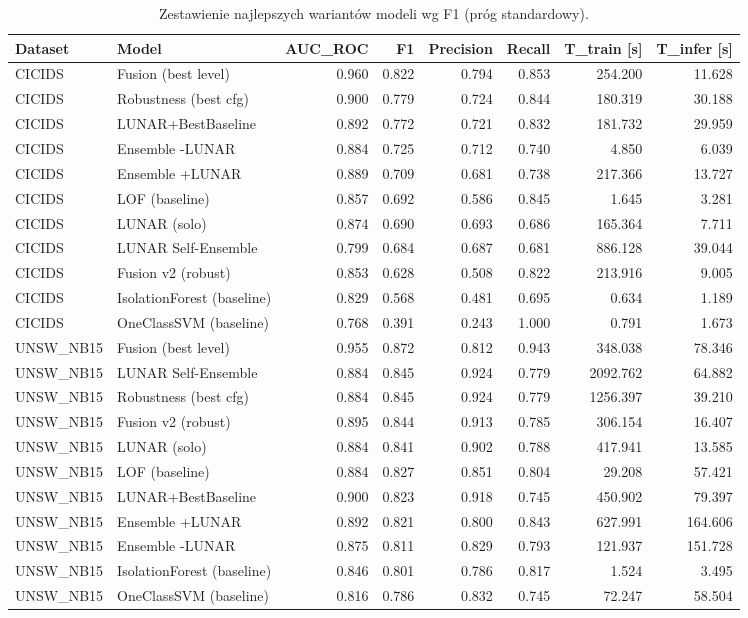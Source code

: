 \begin{table}
\caption{Zestawienie najlepszych wariantów modeli wg F1 (próg standardowy).}
\label{tab:final_comparison}
\begin{tabular}{llrrrrrr}
\toprule
Dataset & Model & AUC\_ROC & F1 & Precision & Recall & T\_train [s] & T\_infer [s] \\
\midrule
CICIDS & Fusion (best level) & 0.960 & 0.822 & 0.794 & 0.853 & 254.200 & 11.628 \\
CICIDS & Robustness (best cfg) & 0.900 & 0.779 & 0.724 & 0.844 & 180.319 & 30.188 \\
CICIDS & LUNAR+BestBaseline & 0.892 & 0.772 & 0.721 & 0.832 & 181.732 & 29.959 \\
CICIDS & Ensemble -LUNAR & 0.884 & 0.725 & 0.712 & 0.740 & 4.850 & 6.039 \\
CICIDS & Ensemble +LUNAR & 0.889 & 0.709 & 0.681 & 0.738 & 217.366 & 13.727 \\
CICIDS & LOF (baseline) & 0.857 & 0.692 & 0.586 & 0.845 & 1.645 & 3.281 \\
CICIDS & LUNAR (solo) & 0.874 & 0.690 & 0.693 & 0.686 & 165.364 & 7.711 \\
CICIDS & LUNAR Self-Ensemble & 0.799 & 0.684 & 0.687 & 0.681 & 886.128 & 39.044 \\
CICIDS & Fusion v2 (robust) & 0.853 & 0.628 & 0.508 & 0.822 & 213.916 & 9.005 \\
CICIDS & IsolationForest (baseline) & 0.829 & 0.568 & 0.481 & 0.695 & 0.634 & 1.189 \\
CICIDS & OneClassSVM (baseline) & 0.768 & 0.391 & 0.243 & 1.000 & 0.791 & 1.673 \\
UNSW\_NB15 & Fusion (best level) & 0.955 & 0.872 & 0.812 & 0.943 & 348.038 & 78.346 \\
UNSW\_NB15 & LUNAR Self-Ensemble & 0.884 & 0.845 & 0.924 & 0.779 & 2092.762 & 64.882 \\
UNSW\_NB15 & Robustness (best cfg) & 0.884 & 0.845 & 0.924 & 0.779 & 1256.397 & 39.210 \\
UNSW\_NB15 & Fusion v2 (robust) & 0.895 & 0.844 & 0.913 & 0.785 & 306.154 & 16.407 \\
UNSW\_NB15 & LUNAR (solo) & 0.884 & 0.841 & 0.902 & 0.788 & 417.941 & 13.585 \\
UNSW\_NB15 & LOF (baseline) & 0.884 & 0.827 & 0.851 & 0.804 & 29.208 & 57.421 \\
UNSW\_NB15 & LUNAR+BestBaseline & 0.900 & 0.823 & 0.918 & 0.745 & 450.902 & 79.397 \\
UNSW\_NB15 & Ensemble +LUNAR & 0.892 & 0.821 & 0.800 & 0.843 & 627.991 & 164.606 \\
UNSW\_NB15 & Ensemble -LUNAR & 0.875 & 0.811 & 0.829 & 0.793 & 121.937 & 151.728 \\
UNSW\_NB15 & IsolationForest (baseline) & 0.846 & 0.801 & 0.786 & 0.817 & 1.524 & 3.495 \\
UNSW\_NB15 & OneClassSVM (baseline) & 0.816 & 0.786 & 0.832 & 0.745 & 72.247 & 58.504 \\
\bottomrule
\end{tabular}
\end{table}
